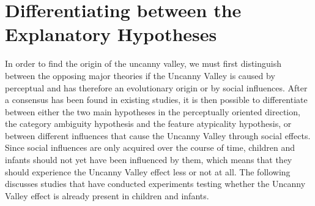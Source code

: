 \section{Differentiating between the Explanatory Hypotheses}
In order to find the origin of the uncanny valley, we must first distinguish between the opposing major theories if the Uncanny Valley is caused by perceptual and has therefore an evolutionary origin or by social influences. After a consensus has been found in existing studies, it is then possible to differentiate between either the two main hypotheses in the perceptually oriented direction, the category ambiguity hypothesis and the feature atypicality hypothesis, or between different influences that cause the Uncanny Valley through social effects. Since social influences are only acquired over the course of time, children and infants should not yet have been influenced by them, which means that they should experience the Uncanny Valley effect less or not at all. The following discusses studies that have conducted experiments testing whether the Uncanny Valley effect is already present in children and infants.
